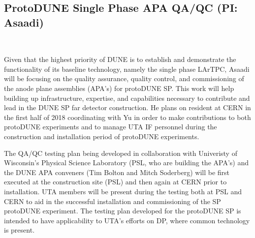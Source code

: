 \subsection{ProtoDUNE Single Phase APA QA/QC (PI: Asaadi)}~\label{sec:proto-dune-sp-apa}

Given that the highest priority of DUNE is to establish and demonstrate the functionality of its baseline technology, namely the single phase LArTPC, Asaadi will be focusing on the quality assurance, quality control, and commissioning of the anode plane assemblies (APA's) for protoDUNE SP. This work will help building up infrastructure, expertise, and capabilities necessary to contribute and lead in the DUNE SP far detector construction.  He plans on resident at CERN in the first half of 2018 coordinating with Yu in order to make contributions to both protoDUNE experiments and to manage UTA IF personnel during the construction and installation period of protoDUNE experiments. 

The QA/QC testing plan being developed in collaboration with Univeristy of Wisconsin's Physical Science Laboratory (PSL, who are building the APA's) and the DUNE APA conveners (Tim Bolton and Mitch Soderberg) will be first executed at the construction site (PSL) and then again at CERN prior to installation. UTA members will be present during the testing both at PSL and CERN to aid in the successful installation and commissioning of the SP protoDUNE experiment. The testing plan developed for the protoDUNE SP is intended to have applicability to UTA's efforts on DP, where common technology is present. 
